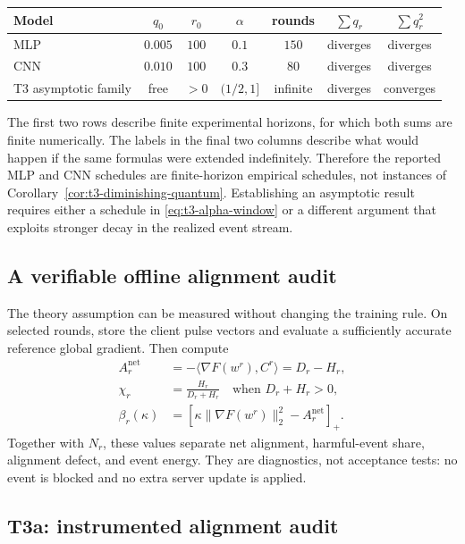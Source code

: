 \begin{center}
\begin{tabular}{lcccccc}
\toprule
Model & $q_0$ & $r_0$ & $\alpha$ & rounds & $\sum q_r$ & $\sum q_r^2$\\
\midrule
MLP & $0.005$ & $100$ & $0.1$ & $150$ & diverges & diverges\\
CNN & $0.010$ & $100$ & $0.3$ & $80$ & diverges & diverges\\
T3 asymptotic family & free & $>0$ & $(1/2,1]$ & infinite & diverges & converges\\
\bottomrule
\end{tabular}
\end{center}

The first two rows describe finite experimental horizons, for which both sums
are finite numerically.  The labels in the final two columns describe what
would happen if the same formulas were extended indefinitely.  Therefore the
reported MLP and CNN schedules are finite-horizon empirical schedules, not
instances of Corollary~\ref{cor:t3-diminishing-quantum}.  Establishing an
asymptotic result requires either a schedule in \eqref{eq:t3-alpha-window} or a
different argument that exploits stronger decay in the realized event stream.

\subsection{A verifiable offline alignment audit}

The theory assumption can be measured without changing the training rule.  On
selected rounds, store the client pulse vectors and evaluate a sufficiently
accurate reference global gradient.  Then compute
\begin{align}
    A_r^{\mathrm{net}}
    &=-\langle\nabla F(w^r),C^r\rangle=D_r-H_r,
    \label{eq:t3-audit-net-alignment}\\
    \chi_r
    &=\frac{H_r}{D_r+H_r}
      \quad\text{when }D_r+H_r>0,
    \label{eq:t3-audit-harm-fraction}\\
    \beta_r(\kappa)
    &=\left[
       \kappa\|\nabla F(w^r)\|_2^2-A_r^{\mathrm{net}}
      \right]_+.
    \label{eq:t3-audit-defect}
\end{align}
Together with $N_r$, these values separate net alignment, harmful-event share,
alignment defect, and event energy.  They are diagnostics, not acceptance
tests: no event is blocked and no extra server update is applied.

\subsection{T3a: instrumented alignment audit}
\label{sec:t3a-alignment-audit}

